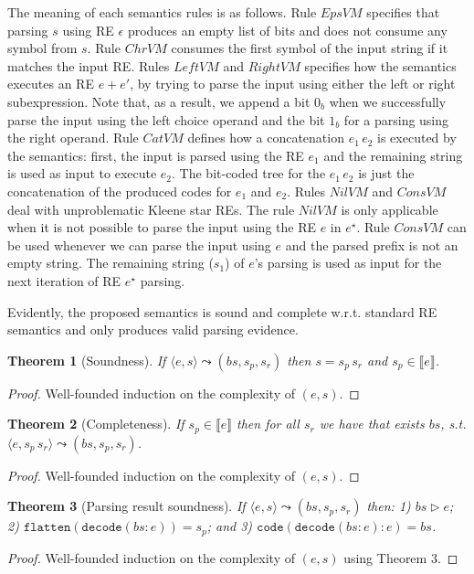 \documentclass[oneside,12pt]{scrbook}
\newtheorem{Theorem}{Theorem}
\theoremstyle{definition}
\newcommand{\sembrackets}[1]{\ensuremath{\llbracket #1 \rrbracket}}
\newcommand{\flatten}{\ensuremath{\texttt{flatten}}}
\newcommand{\code}{\ensuremath{\texttt{code}}}
\newcommand{\decodee}{\ensuremath{\texttt{decode}}}
\theoremstyle{plain}
\theoremstyle{definition}
\begin{document}
The meaning of each semantics rules is as follows. Rule $EpsVM$ specifies that parsing $s$ using RE $\epsilon$ produces 
an empty list of bits and does not consume any symbol from $s$. Rule $ChrVM$ consumes the first symbol of the input string
if it matches the input RE.  Rules $LeftVM$ and 
$RightVM$ specifies how the semantics executes an RE $e + e'$, by trying to
parse the input using either the left or right subexpression. Note that, as a result, we append a bit $0_b$ when we successfully 
parse the input using the left choice operand and the bit $1_b$ for a parsing using the right operand. Rule $CatVM$ defines 
how a concatenation $e_1\,e_2$ is executed by the semantics: first, the input is parsed using the RE $e_1$ and the remaining 
string is used as input to execute $e_2$. The bit-coded tree for the $e_1\,e_2$ is just the concatenation of the produced 
codes for $e_1$ and $e_2$. Rules $NilVM$ and $ConsVM$ deal with unproblematic Kleene star REs. The rule $NilVM$ is only applicable when
it is not possible to parse the input using the RE $e$ in $e^\star$. Rule $ConsVM$ can be used whenever we can parse the
input using $e$ and the parsed prefix is not an empty string. The remaining string ($s_1$) of $e$'s parsing is used as
input for the next iteration of RE $e^\star$ parsing. 

Evidently, the proposed semantics is sound and complete w.r.t. standard RE
semantics and only produces valid parsing evidence.

\begin{Theorem}[Soundness]
	If $\langle e, s \rangle \leadsto (bs,s_p,s_r)$ then $s = s_p\,s_r$ and $s_p\in\sembrackets{e}$.
\end{Theorem}
\begin{proof}
	Well-founded induction on the complexity of $(e,s)$.
\end{proof}

\begin{Theorem}[Completeness]
	If $s_p\in\sembrackets{e}$ then for all $s_r$ we have that exists $bs$, s.t. $\langle e, s_p\,s_r \rangle \leadsto (bs,s_p,s_r)$.
\end{Theorem}
\begin{proof}
	Well-founded induction on the complexity of $(e,s)$.
\end{proof}

\begin{Theorem}[Parsing result soundness]
	If $\langle e, s \rangle \leadsto (bs,s_p,s_r)$ then: 1) $bs \rhd e$; 2) $\flatten(\decodee(bs : e)) = s_p$; and 3)
	$\code(\decodee(bs : e) : e) = bs$. 
\end{Theorem}
\begin{proof}
	Well-founded induction on the complexity of $(e,s)$ using Theorem 3.
\end{proof}
\end{document}
